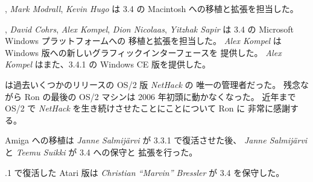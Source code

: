 \medskip
, {\it Mark Modrall}, {\it Kevin Hugo} は
3.4 の Macintosh への移植と拡張を担当した。

\medskip
, {\it David Cohrs}, {\it Alex Kompel}, {\it Dion Nicolaas},
{\it Yitzhak Sapir} は 3.4 の Microsoft Windows プラットフォームへの
移植と拡張を担当した。
{\it Alex Kompel} は Windows 版への新しいグラフィックインターフェースを
提供した。
{\it Alex Kompel} はまた、3.4.1 の Windows CE 版を提供した。

\medskip
 は過去いくつかのリリースの OS/2 版 {\it NetHack\/} の
唯一の管理者だった。
残念ながら Ron の最後の OS/2 マシンは 2006 年初頭に動かなくなった。
近年まで OS/2 で {\it NetHack\/} を生き続けさせたことにことについて Ron に
非常に感謝する。

\medskip
\nd Amiga への移植は {\it Janne Salmij\"{a}rvi} が 3.3.1 で復活させた後、
{\it Janne Salmij\"{a}rvi} と {\it Teemu Suikki} が 3.4 への保守と
拡張を行った。

\medskip
.1 で復活した Atari 版は
{\it Christian ``Marvin'' Bressler} が 3.4 を保守した。

